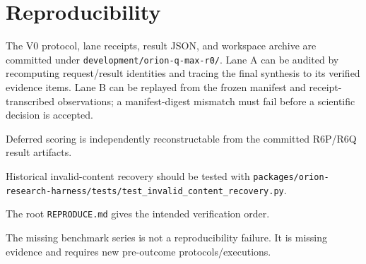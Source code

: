 \section{Reproducibility}

The V0 protocol, lane receipts, result JSON, and workspace archive are committed under \texttt{development/orion-q-max-r0/}. Lane A can be audited by recomputing request/result identities and tracing the final synthesis to its verified evidence items. Lane B can be replayed from the frozen manifest and receipt-transcribed observations; a manifest-digest mismatch must fail before a scientific decision is accepted.

Deferred scoring is independently reconstructable from the committed R6P/R6Q result artifacts. {\sloppy
Historical invalid-content recovery should be tested with \texttt{packages/\allowbreak orion-research-harness/\allowbreak tests/\allowbreak test_invalid_content_recovery.py}.

}
The root \texttt{REPRODUCE.md} gives the intended verification order.

The missing benchmark series is not a reproducibility failure. It is missing evidence and requires new pre-outcome protocols/executions.